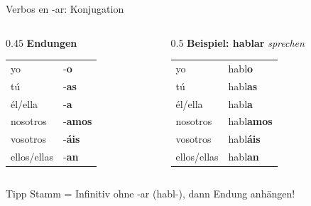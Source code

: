 \documentclass[aspectratio=169, 11pt]{beamer}
\newcommand{\de}[1]{\textit{\textcolor{mittelgrau}{#1}}}
\DeclareRobustCommand{\endung}[1]{\textcolor{akzent}{\textbf{#1}}}
\begin{document}

\begin{frame}{Verbos en -ar: Konjugation}
    \vspace{0.3cm}

    \begin{columns}[T]
        \begin{column}{0.45\textwidth}
            \textbf{Endungen}

            \vspace{0.3cm}

            \renewcommand{\arraystretch}{1.4}
            \begin{tabular}{ll}
                yo & -\endung{o} \\
                tú & -\endung{as} \\
                él/ella & -\endung{a} \\
                nosotros & -\endung{amos} \\
                vosotros & -\endung{áis} \\
                ellos/ellas & -\endung{an} \\
            \end{tabular}
        \end{column}

        \begin{column}{0.5\textwidth}
            \textbf{Beispiel: hablar} \de{sprechen}

            \vspace{0.3cm}

            \renewcommand{\arraystretch}{1.4}
            \begin{tabular}{ll}
                yo & habl\endung{o} \\
                tú & habl\endung{as} \\
                él/ella & habl\endung{a} \\
                nosotros & habl\endung{amos} \\
                vosotros & habl\endung{áis} \\
                ellos/ellas & habl\endung{an} \\
            \end{tabular}
        \end{column}
    \end{columns}

    \vspace{0.5cm}

    \begin{block}{Tipp}
        Stamm = Infinitiv ohne -ar (habl-), dann Endung anhängen!
    \end{block}
\end{frame}
\end{document}
